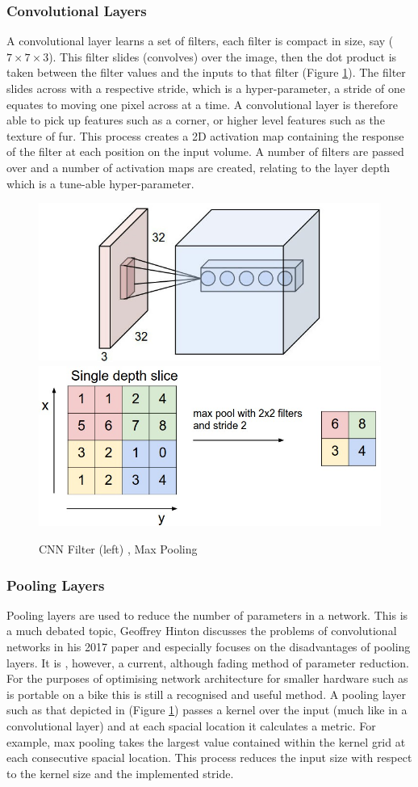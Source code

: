 \documentclass[11pt,twoside]{report}
\begin{document}
\subsubsection{Convolutional Layers}
A convolutional layer learns a set of filters, each filter is compact in size, say ($7 \times 7 \times 3$). This filter slides (convolves) over the image, then the dot product is taken between the filter values and the inputs to that filter (Figure \ref{CNN_filter}). The filter slides across with a respective stride, which is a hyper-parameter, a stride of one equates to moving one pixel across at a time. A convolutional layer is therefore able to pick up features such as a corner, or higher level features such as the texture of fur. This process creates a 2D activation map containing the response of the filter at each position on the input volume. A number of filters are passed over and a number of activation maps are created, relating to the layer depth which is a tune-able hyper-parameter.

\noindent \begin{figure}[h!]
	\includegraphics[width = 0.5\hsize]{./figures/conv_filter.jpg}
	\includegraphics[width = 0.5\hsize]{./figures/maxpool.jpeg}
	\caption{CNN Filter (left) \cite{StanfordCS231_conv_filter}, Max Pooling \cite{StanfordCS231_max_pool}}
	\label{CNN_filter}
\end{figure}

\subsubsection{Pooling Layers}
Pooling layers are used to reduce the number of parameters in a network. This is a much debated topic, Geoffrey Hinton discusses the problems of convolutional networks in his 2017 paper \cite{DBLP:journals/corr/abs-1710-09829} and especially focuses on the disadvantages of pooling layers. It is , however, a current, although fading method of parameter reduction. For the purposes of optimising network architecture for smaller hardware such as is portable on a bike this is still a recognised and useful method.
\newline \newline
A pooling layer such as that depicted in (Figure \ref{CNN_filter}) passes a kernel over the input (much like in a convolutional layer) and at each spacial location it calculates a metric. For example, max pooling takes the largest value contained within the kernel grid at each consecutive spacial location. This process reduces the input size with respect to the kernel size and the implemented stride.
\end{document}
